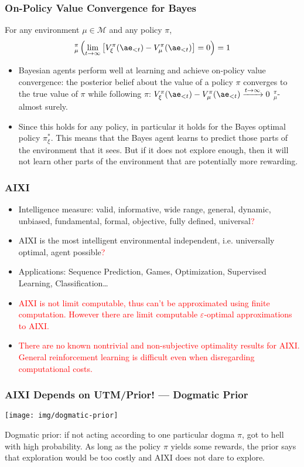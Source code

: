\documentclass[UTF8,11pt,colorlinks,compress,openany]{beamer}%
\begin{document}
\begin{frame}\frametitle{On-Policy Value Convergence for Bayes}
\begin{theorem}
For any environment $\mu\in\mathcal{M}$ and any policy $\pi$,
\[
{}_\mu^\pi\left(\lim\limits_{t\to\infty}\left[V_\xi^\pi(\ae_{<t}) - V_\mu^\pi(\ae_{<t})\right]=0\right)=1
\]
\end{theorem}
\begin{itemize}
	\item Bayesian agents perform well at learning and achieve on-policy value convergence: the posterior belief about the value of a policy $\pi$ converges to the true value of $\pi$ while following $\pi$: $V^\pi_\xi(\ae_{<t})-V^\pi_\mu(\ae_{<t})\xrightarrow{t\to\infty}0$ ${}_\mu^\pi$-almost surely.
	\item Since this holds for any policy, in particular it holds for the Bayes optimal policy $\pi^*_\xi$. This means that the Bayes agent learns to predict those parts of the environment that it sees. But if it does not explore enough, then it will not learn other parts of the environment that are potentially more rewarding.
\end{itemize}
\end{frame}

\begin{frame}\frametitle{AIXI}
	\begin{itemize}
		\item Intelligence measure: valid, informative, wide range, general, dynamic, unbiased, fundamental, formal, objective, fully defined, universal\textcolor{red}{?}
		\item AIXI is the most intelligent environmental independent, i.e. universally optimal, agent possible\textcolor{red}{?}
		\item Applications: Sequence Prediction, Games, Optimization, Supervised Learning, Classification\dots
		\item \textcolor{red}{AIXI is not limit computable, thus can't be approximated using finite computation. However there are limit computable $\varepsilon$-optimal approximations to AIXI.}
		\item \textcolor{red}{There are no known nontrivial and non-subjective optimality results for AIXI. General reinforcement learning is difficult even when disregarding computational costs.}
	\end{itemize}
\end{frame}

\begin{frame}\frametitle{AIXI Depends on UTM/Prior! --- Dogmatic Prior}
\setlength\abovedisplayskip{0pt}
\setlength\belowdisplayskip{0pt}
	\begin{center}
	\texttt{[image: img/dogmatic-prior]}
	\end{center}
	Dogmatic prior: if not acting according to one particular dogma $\pi$, got to hell with high probability. As long as the policy $\pi$ yields some rewards, the prior says that exploration would be too costly and AIXI does not dare to explore.
\end{frame}
\end{document}
